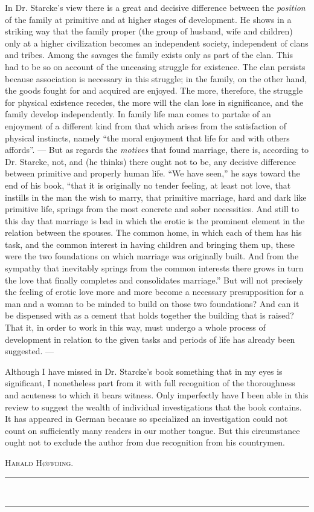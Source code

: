 \documentclass[12pt,a4paper,openany]{book}
\newcommand{\opage}[1]{\marginnote{\footnotesize\textit{[#1]}}}
\begin{document}
In Dr. Starcke's view there is a great and decisive
difference between the \emph{position} of the family at primitive and at higher
stages of development. He shows in a striking way that the family proper
(the group of husband, wife and children) only at a higher
civilization becomes an independent society, independent of clans and tribes.
Among the savages the family exists only as part
of the clan. This had to be so on account of the unceasing
struggle for existence. The clan persists because association
is necessary in this struggle; in the family, on the other hand,
the goods fought for and acquired are enjoyed. The more, therefore, the struggle for
physical existence recedes, the more will the clan lose in
significance, and the family develop independently. In family life
man comes to partake of an enjoyment of a different kind from that which
arises from the satisfaction of physical instincts, namely ``the
moral enjoyment that life for and with others affords''. --- But
as regards the \emph{motives} that found marriage, there is, according to Dr.
Starcke, not, and (he thinks) there ought not to be, any decisive
difference between primitive and properly human life. ``We
have seen,'' he says toward the end of his book, ``that it is originally
no tender feeling, at least not love,
that instills in the man the wish to marry, that primitive
\opage{795}marriage, hard and dark like primitive life, springs from
the most concrete and sober necessities. And still to this day
that marriage is bad in which the erotic is the prominent element
in the relation between the spouses. The common home, in which
each of them has his task, and the common interest in having
children and bringing them up, these were the two foundations on which
marriage was originally built. And from the sympathy that
inevitably springs from the common interests there grows in turn the
love that finally completes and consolidates marriage.'' But
will not precisely the feeling of erotic love more and more become a necessary
presupposition for a man and a woman to be minded
to build on those two foundations? And can it be dispensed with as
a cement that holds together the building that is raised? That it,
in order to work in this way, must undergo a whole process of development
in relation to the given tasks and periods of life has already been
suggested. ---

Although I have missed in Dr. Starcke's book something that in my eyes is significant,
I nonetheless part from it with full recognition
of the thoroughness and acuteness to which it bears witness. Only
imperfectly have I been able in this review to suggest the
wealth of individual investigations that the book contains. It has
appeared in German because so specialized an investigation could not
count on sufficiently many readers in our mother tongue.
But this circumstance ought not to exclude the author from due
recognition from his countrymen.

\begin{flushright}\textsc{Harald Høffding.}\end{flushright}
\begin{center}\rule{2.6cm}{0.4pt}\\[-10pt]\rule{2.6cm}{0.4pt}\end{center}
\end{document}
